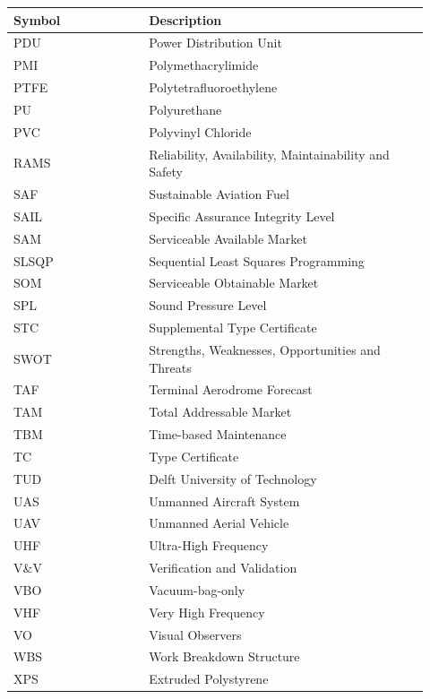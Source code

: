 \hfill
\begin{minipage}[t]{0.31\textwidth}
\begin{tabular}{@{}%
>{\raggedright\arraybackslash}p{0.30\linewidth}
>{\raggedright\arraybackslash}p{0.62\linewidth}@{}}
\toprule
\textbf{Symbol} & \textbf{Description} \\
\midrule
PDU    & Power Distribution Unit \\
PMI    & Polymethacrylimide \\
PTFE   & Polytetrafluoroethylene \\
PU     & Polyurethane \\
PVC    & Polyvinyl Chloride \\
RAMS   & Reliability, Availability, Maintainability and Safety \\
SAF    & Sustainable Aviation Fuel \\
SAIL   & Specific Assurance Integrity Level \\
SAM    & Serviceable Available Market \\
SLSQP  & Sequential Least Squares Programming \\
SOM    & Serviceable Obtainable Market \\
SPL    & Sound Pressure Level \\
STC    & Supplemental Type Certificate \\
SWOT   & Strengths, Weaknesses, Opportunities and Threats \\
TAF    & Terminal Aerodrome Forecast \\
TAM    & Total Addressable Market \\
TBM    & Time-based Maintenance \\
TC     & Type Certificate \\
TUD    & Delft University of Technology \\
UAS    & Unmanned Aircraft System \\
UAV    & Unmanned Aerial Vehicle \\
UHF    & Ultra-High Frequency \\
V\&V   & Verification and Validation \\
VBO    & Vacuum-bag-only \\
VHF    & Very High Frequency \\
VO     & Visual Observers \\
WBS    & Work Breakdown Structure \\
XPS    & Extruded Polystyrene \\
\bottomrule
\end{tabular}
\end{minipage}
